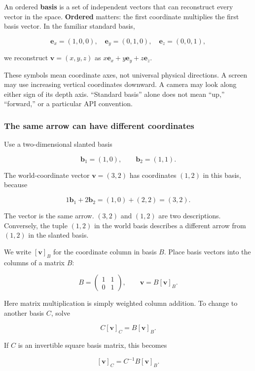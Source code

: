 An ordered \textbf{basis} is a set of independent vectors that can reconstruct every vector in the space. \textbf{Ordered} matters: the first coordinate multiplies the first basis vector. In the familiar standard basis,

\[
\mathbf e_x=(1,0,0),\quad
\mathbf e_y=(0,1,0),\quad
\mathbf e_z=(0,0,1),
\]

we reconstruct \(\mathbf v=(x,y,z)\) as \(x\mathbf e_x+y\mathbf e_y+z\mathbf e_z\).

These symbols mean coordinate axes, not universal physical directions. A screen may use increasing vertical coordinates downward. A camera may look along either sign of its depth axis. ``Standard basis'' alone does not mean ``up,'' ``forward,'' or a particular API convention.

\subsubsection{The same arrow can have different coordinates}\label{01-foundations-i-ch017-the-same-arrow-can-have-different-coordinates}

Use a two-dimensional slanted basis

\[
\mathbf b_1=(1,0),\qquad \mathbf b_2=(1,1).
\]

The world-coordinate vector \(\mathbf v=(3,2)\) has coordinates \((1,2)\) in this basis, because

\[
1\mathbf b_1+2\mathbf b_2=(1,0)+(2,2)=(3,2).
\]

The vector is the same arrow. \((3,2)\) and \((1,2)\) are two descriptions. Conversely, the tuple \((1,2)\) in the world basis describes a different arrow from \((1,2)\) in the slanted basis.

We write \([\mathbf v]_B\) for the coordinate column in basis \(B\). Place basis vectors into the columns of a matrix \(B\):

\[
B=\begin{pmatrix}1&1\\0&1\end{pmatrix},\qquad
\mathbf v=B[\mathbf v]_B.
\]

Here matrix multiplication is simply weighted column addition. To change to another basis \(C\), solve

\[
C[\mathbf v]_C=B[\mathbf v]_B.
\]

If \(C\) is an invertible square basis matrix, this becomes

\[
[\mathbf v]_C=C^{-1}B[\mathbf v]_B.
\]

